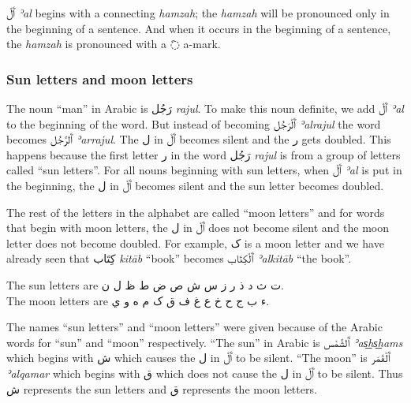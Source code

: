 \documentclass[
  10pt,
]{book}
\begin{document}
\foreignlanguage{arabic}{ٱَلْ} \emph{ʾal}
begins with a connecting \emph{hamzah}; the \emph{hamzah} will be pronounced only in the beginning of a sentence. And when it occurs in the beginning of a sentence, the \emph{hamzah} is pronounced with a \foreignlanguage{arabic}{◌َ} a-mark.

\subsubsection{Sun letters and moon letters}\label{sun-letters-and-moon-letters}

The noun \enquote{man} in Arabic is \foreignlanguage{arabic}{رَجُل} \emph{rajul}. To make this noun definite, we add \foreignlanguage{arabic}{ٱَلْ} \emph{ʾal} to the beginning of the word. But instead of becoming \foreignlanguage{arabic}{ٱَلْرَجُل} \emph{ʾalrajul} the word becomes \foreignlanguage{arabic}{ٱَلرَّجُل} \emph{ʾarrajul}. The \foreignlanguage{arabic}{ل} in \foreignlanguage{arabic}{ٱَلْ} becomes silent and the \foreignlanguage{arabic}{ر} gets doubled. This happens because the first letter \foreignlanguage{arabic}{ر} in the word \foreignlanguage{arabic}{رَجُل} \emph{rajul} is from a group of letters called \enquote{sun letters}. For all nouns beginning with sun letters, when \foreignlanguage{arabic}{ٱَلْ} \emph{ʾal} is put in the beginning, the \foreignlanguage{arabic}{ل} in \foreignlanguage{arabic}{ٱَلْ} becomes silent and the sun letter becomes doubled.

The rest of the letters in the alphabet are called \enquote{moon letters} and for words that begin with moon letters, the \foreignlanguage{arabic}{ل} in \foreignlanguage{arabic}{ٱَلْ} does not become silent and the moon letter does not become doubled. For example, \foreignlanguage{arabic}{ک} is a moon letter and we have already seen that \foreignlanguage{arabic}{کِتَاب} \emph{kitāb} \enquote{book} becomes \foreignlanguage{arabic}{ٱَلْکِتَاب} \emph{ʾalkitāb} \enquote{the book}.

The sun letters are \foreignlanguage{arabic}{ت ث د ذ ر ز س ش ص ض ط ظ ل ن}.\\
The moon letters are \foreignlanguage{arabic}{ء ب ج ح خ ع غ ف ق ک م ه و ي}.

The names \enquote{sun letters} and \enquote{moon letters} were given because of the Arabic words for \enquote{sun} and \enquote{moon} respectively. \enquote{The sun} in Arabic is \foreignlanguage{arabic}{ٱَلشَّمْس} \emph{ʾas͟hs͟hams} which begins with \foreignlanguage{arabic}{ش} which causes the \foreignlanguage{arabic}{ل} in \foreignlanguage{arabic}{ٱَلْ} to be silent. \enquote{The moon} is \foreignlanguage{arabic}{ٱَلْقَمَر} \emph{ʾalqamar} which begins with \foreignlanguage{arabic}{ق} which does not cause the \foreignlanguage{arabic}{ل} in \foreignlanguage{arabic}{ٱَلْ} to be silent. Thus \foreignlanguage{arabic}{ش} represents the sun letters and \foreignlanguage{arabic}{ق} represents the moon letters.
\end{document}
